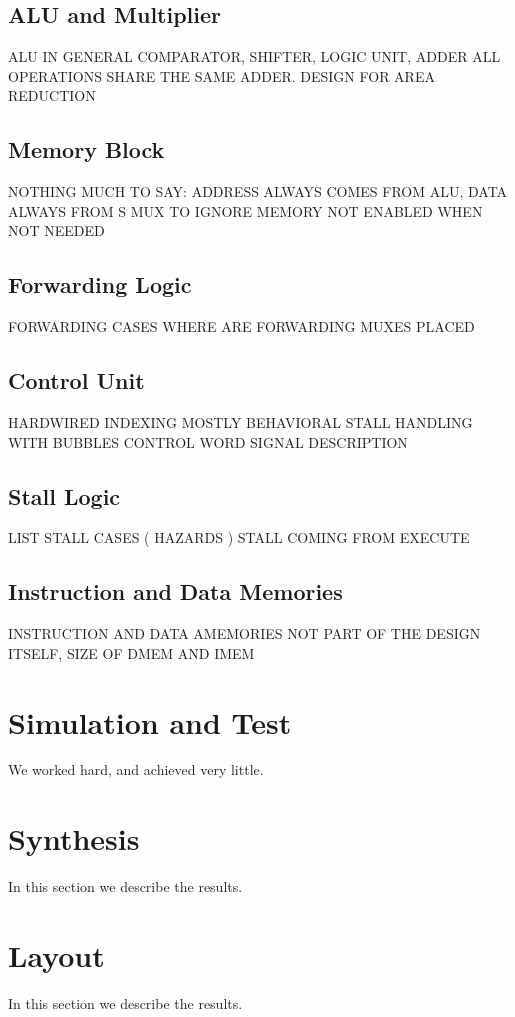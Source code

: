 \documentclass[12pt]{article}
\begin{document}
\subsection{ALU and Multiplier}
ALU IN GENERAL COMPARATOR, SHIFTER, LOGIC UNIT, ADDER
ALL OPERATIONS SHARE THE SAME ADDER. DESIGN FOR AREA REDUCTION
\subsection{Memory Block}
NOTHING MUCH TO SAY: ADDRESS ALWAYS COMES FROM ALU, DATA ALWAYS FROM S
MUX TO IGNORE MEMORY
NOT ENABLED WHEN NOT NEEDED

\subsection{Forwarding Logic}
FORWARDING CASES
WHERE ARE FORWARDING MUXES PLACED


\subsection{Control Unit}
HARDWIRED
INDEXING
MOSTLY BEHAVIORAL
STALL HANDLING WITH BUBBLES
CONTROL WORD SIGNAL DESCRIPTION



\subsection{Stall Logic}
LIST STALL CASES ( HAZARDS )
STALL COMING FROM EXECUTE


\subsection{Instruction and Data Memories}
INSTRUCTION AND DATA AMEMORIES NOT PART OF THE DESIGN ITSELF, SIZE OF DMEM AND IMEM

\section{Simulation and Test}\label{Conclusions}
We worked hard, and achieved very little.

\section{Synthesis}\label{Synthesis}
In this section we describe the results.


\section{Layout}\label{Layout}
In this section we describe the results.



\end{document}
